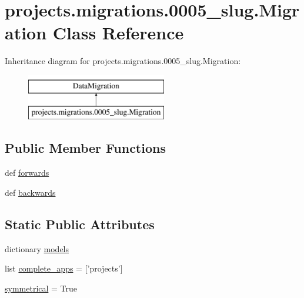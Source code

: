 \hypertarget{classprojects_1_1migrations_1_10005__slug_1_1_migration}{\section{projects.\-migrations.0005\-\_\-slug.Migration Class Reference}
\label{classprojects_1_1migrations_1_10005__slug_1_1_migration}
}
Inheritance diagram for projects.\-migrations.0005\-\_\-slug.Migration\-:\begin{figure}[H]
\begin{center}
\leavevmode
\includegraphics[height=2.000000cm]{classprojects_1_1migrations_1_10005__slug_1_1_migration}
\end{center}
\end{figure}
\subsection*{Public Member Functions}
\begin{DoxyCompactItemize}
\item 
def \hyperlink{classprojects_1_1migrations_1_10005__slug_1_1_migration_a2423790c07d1b066ebc45f0c4290472f}{forwards}
\item 
def \hyperlink{classprojects_1_1migrations_1_10005__slug_1_1_migration_ac256b9fb386ddf6c63eef1cc6993b3a5}{backwards}
\end{DoxyCompactItemize}
\subsection*{Static Public Attributes}
\begin{DoxyCompactItemize}
\item 
dictionary \hyperlink{classprojects_1_1migrations_1_10005__slug_1_1_migration_ad308bb15f66745ab0fd66dbfd391cfbb}{models}
\item 
list \hyperlink{classprojects_1_1migrations_1_10005__slug_1_1_migration_a9ba662762b7fa3708070007be8695180}{complete\-\_\-apps} = \mbox{[}'projects'\mbox{]}
\item 
\hyperlink{classprojects_1_1migrations_1_10005__slug_1_1_migration_a05bfe24a22650a88327db1183aab8013}{symmetrical} = True
\end{DoxyCompactItemize}


